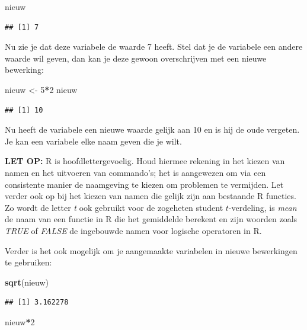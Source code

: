 \documentclass[
]{book}
\newenvironment{Shaded}{\begin{snugshade}}{\end{snugshade}}
\newcommand{\DecValTok}[1]{\textcolor[rgb]{0.00,0.00,0.81}{#1}}
\newcommand{\FunctionTok}[1]{\textcolor[rgb]{0.13,0.29,0.53}{\textbf{#1}}}
\newcommand{\NormalTok}[1]{#1}
\newcommand{\OtherTok}[1]{\textcolor[rgb]{0.56,0.35,0.01}{#1}}
\newcommand{\SpecialCharTok}[1]{\textcolor[rgb]{0.81,0.36,0.00}{\textbf{#1}}}
\begin{document}
\begin{Shaded}
\begin{Highlighting}[]
\NormalTok{nieuw}
\end{Highlighting}
\end{Shaded}

\begin{verbatim}
## [1] 7
\end{verbatim}

Nu zie je dat deze variabele de waarde 7 heeft. Stel dat je de variabele een andere waarde wil geven,
dan kan je deze gewoon overschrijven met een nieuwe bewerking:

\begin{Shaded}
\begin{Highlighting}[]
\NormalTok{nieuw }\OtherTok{\textless{}{-}} \DecValTok{5}\SpecialCharTok{*}\DecValTok{2}
\NormalTok{nieuw}
\end{Highlighting}
\end{Shaded}

\begin{verbatim}
## [1] 10
\end{verbatim}

Nu heeft de variabele een nieuwe waarde gelijk aan 10 en is hij de oude vergeten. Je kan een variabele elke naam geven die je wilt.

\textbf{LET OP:} R is hoofdlettergevoelig. Houd hiermee rekening in het kiezen van namen en het uitvoeren
van commando's; het is aangewezen om via een consistente manier de naamgeving te kiezen om problemen te vermijden.
Let verder ook op bij het kiezen van namen die gelijk zijn aan bestaande R functies. Zo wordt de letter \emph{t} ook gebruikt voor de zogeheten student \(t\)-verdeling, is \emph{mean} de naam van een functie in R die het gemiddelde berekent en zijn woorden zoals \emph{TRUE} of \emph{FALSE} de ingebouwde namen voor logische operatoren in R.

Verder is het ook mogelijk om je aangemaakte variabelen in nieuwe bewerkingen te gebruiken:

\begin{Shaded}
\begin{Highlighting}[]
\FunctionTok{sqrt}\NormalTok{(nieuw)}
\end{Highlighting}
\end{Shaded}

\begin{verbatim}
## [1] 3.162278
\end{verbatim}

\begin{Shaded}
\begin{Highlighting}[]
\NormalTok{nieuw}\SpecialCharTok{*}\DecValTok{2}
\end{Highlighting}
\end{Shaded}
\end{document}
